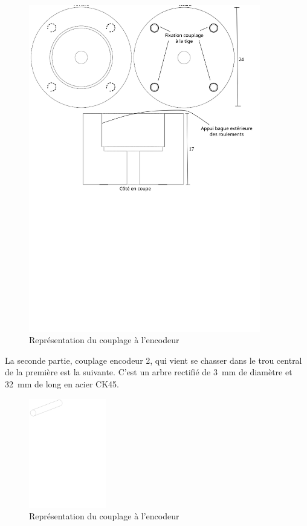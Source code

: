 \begin{figure}[H]
    \centering
    \includegraphics[width = 0.9\textwidth]{assets/figures/CouplageEncodeur.svg}
    \caption{Représentation du couplage à l'encodeur}
    \label{fig:CouplEnco}
\end{figure}

La seconde partie, couplage encodeur 2, qui vient se chasser dans le trou central de la première est la suivante. C'est un arbre rectifié de 3~mm de diamètre et 32~mm
de long en acier CK45.
\begin{figure}[H]
    \centering
    \includegraphics[width = 0.3\textwidth]{assets/figures/CouplageEncodeur2.svg}
    \caption{Représentation du couplage à l'encodeur}
    \label{fig:CouplEnco2}
\end{figure}


